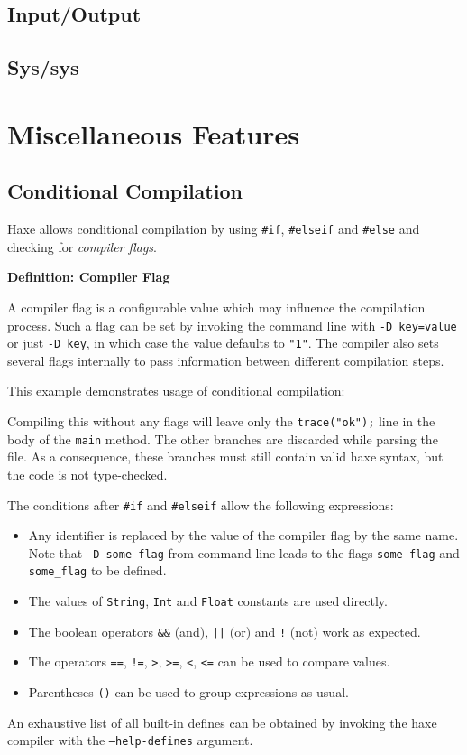 \documentclass{article}
\newcommand{\type}[1]{\texttt{#1}}
\newcommand{\expr}[1]{\texttt{#1}}
\newenvironment{myshaded}
  {\def\FrameCommand{\fboxsep=\topsep\colorbox{bgcolor}}%
  \MakeFramed {\advance\hsize-\width \FrameRestore}}%
 {\endMakeFramed}
\newcommand{\define}[3][Definition]
	{\begin{myshaded}\noindent\textbf{#1: #2}\par\nobreak\noindent\ignorespaces#3\label{def:#2}\end{myshaded}}
\begin{document}
\subsection{Input/Output}

\subsection{Sys/sys}

\section{Miscellaneous Features}
\label{Miscellaneous Features}

\subsection{Conditional Compilation}
\label{Conditional Compilation}

Haxe allows conditional compilation by using \expr{\#if}, \expr{\#elseif} and \expr{\#else} and checking for \emph{compiler flags}.

\define{Compiler Flag}{A compiler flag is a configurable value which may influence the compilation process. Such a flag can be set by invoking the command line with \expr{-D key=value} or just \expr{-D key}, in which case the value defaults to \expr{"1"}. The compiler also sets several flags internally to pass information between different compilation steps.}

This example demonstrates usage of conditional compilation:


Compiling this without any flags will leave only the \expr{trace("ok");} line in the body of the \expr{main} method. The other branches are discarded while parsing the file. As a consequence, these branches must still contain valid haxe syntax, but the code is not type-checked.

The conditions after \expr{\#if} and \expr{\#elseif} allow the following expressions:

\begin{itemize}
	\item Any identifier is replaced by the value of the compiler flag by the same name. Note that \expr{-D some-flag} from command line leads to the flags \expr{some-flag} and \expr{some\_flag} to be defined.
	\item The values of \type{String}, \type{Int} and \type{Float} constants are used directly.
	\item The boolean operators \expr{\&\&} (and), \expr{||} (or) and \expr{!} (not) work as expected.
	\item The operators \expr{==}, \expr{!=}, \expr{>}, \expr{>=}, \expr{<}, \expr{<=} can be used to compare values.
	\item Parentheses \expr{()} can be used to group expressions as usual.
\end{itemize}
An exhaustive list of all built-in defines can be obtained by invoking the haxe compiler with the \expr{--help-defines} argument.
\end{document}
